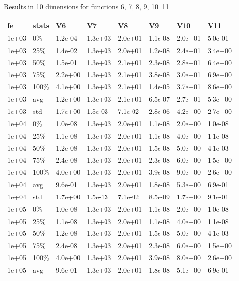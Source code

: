 \documentclass[11pt]{article}
\begin{document}
Results in 10 dimensions for functions 6, 7, 8, 9, 10, 11
\begin{longtable}{llllllll}
  \hline
fe & stats & V6 & V7 & V8 & V9 & V10 & V11 \\ 
  \hline
1e+03 & 0\% & 1.2e-04 & 1.3e+03 & 2.0e+01 & 1.1e-08 & 2.0e+01 & 5.0e-01 \\ 
  1e+03 & 25\% & 1.4e-02 & 1.3e+03 & 2.0e+01 & 1.2e-08 & 2.4e+01 & 3.4e+00 \\ 
  1e+03 & 50\% & 1.5e-01 & 1.3e+03 & 2.1e+01 & 2.3e-08 & 2.8e+01 & 6.4e+00 \\ 
  1e+03 & 75\% & 2.2e+00 & 1.3e+03 & 2.1e+01 & 3.8e-08 & 3.0e+01 & 6.9e+00 \\ 
  1e+03 & 100\% & 4.1e+00 & 1.3e+03 & 2.1e+01 & 1.4e-05 & 3.7e+01 & 8.6e+00 \\ 
  1e+03 & avg & 1.2e+00 & 1.3e+03 & 2.1e+01 & 6.5e-07 & 2.7e+01 & 5.3e+00 \\ 
  1e+03 & std & 1.7e+00 & 1.5e-03 & 7.1e-02 & 2.8e-06 & 4.2e+00 & 2.7e+00 \\ 
  1e+04 & 0\% & 1.0e-08 & 1.3e+03 & 2.0e+01 & 1.1e-08 & 2.0e+00 & 1.0e-08 \\ 
  1e+04 & 25\% & 1.1e-08 & 1.3e+03 & 2.0e+01 & 1.1e-08 & 4.0e+00 & 1.1e-08 \\ 
  1e+04 & 50\% & 1.2e-08 & 1.3e+03 & 2.0e+01 & 1.5e-08 & 5.0e+00 & 4.1e-03 \\ 
  1e+04 & 75\% & 2.4e-08 & 1.3e+03 & 2.0e+01 & 2.3e-08 & 6.0e+00 & 1.5e+00 \\ 
  1e+04 & 100\% & 4.0e+00 & 1.3e+03 & 2.0e+01 & 3.9e-08 & 9.0e+00 & 2.6e+00 \\ 
  1e+04 & avg & 9.6e-01 & 1.3e+03 & 2.0e+01 & 1.8e-08 & 5.3e+00 & 6.9e-01 \\ 
  1e+04 & std & 1.7e+00 & 1.5e-13 & 7.1e-02 & 8.5e-09 & 1.7e+00 & 9.1e-01 \\ 
  1e+05 & 0\% & 1.0e-08 & 1.3e+03 & 2.0e+01 & 1.1e-08 & 2.0e+00 & 1.0e-08 \\ 
  1e+05 & 25\% & 1.1e-08 & 1.3e+03 & 2.0e+01 & 1.1e-08 & 4.0e+00 & 1.1e-08 \\ 
  1e+05 & 50\% & 1.2e-08 & 1.3e+03 & 2.0e+01 & 1.5e-08 & 5.0e+00 & 4.1e-03 \\ 
  1e+05 & 75\% & 2.4e-08 & 1.3e+03 & 2.0e+01 & 2.3e-08 & 6.0e+00 & 1.5e+00 \\ 
  1e+05 & 100\% & 4.0e+00 & 1.3e+03 & 2.0e+01 & 3.9e-08 & 8.0e+00 & 2.6e+00 \\ 
  1e+05 & avg & 9.6e-01 & 1.3e+03 & 2.0e+01 & 1.8e-08 & 5.1e+00 & 6.9e-01 \\ 

\end{longtable}
\end{document}
